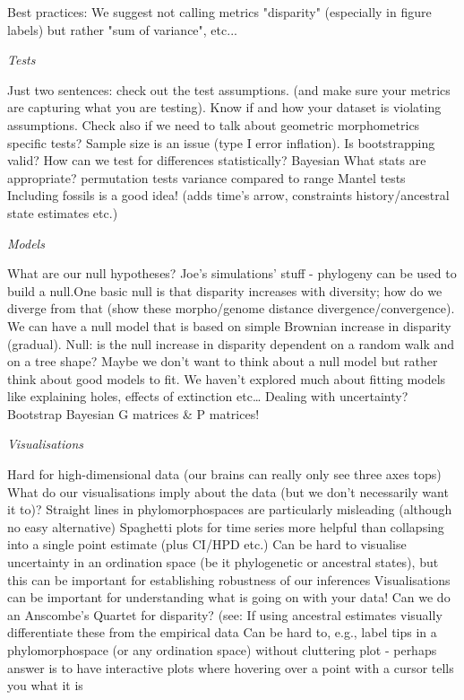 \documentclass[12pt,letterpaper]{article}
\renewcommand{\subsection}[1]{%
\bigskip
\begin{center}
\begin{large}
\normalfont\itshape #1
\end{large}
\end{center}}
\begin{document}
Best practices:
We suggest not calling metrics "disparity" (especially in figure labels) but rather "sum of variance", etc...

\subsection{Tests}
Just two sentences: check out the test assumptions. (and make sure your metrics are capturing what you are testing). Know if and how your dataset is violating assumptions. Check also if we need to talk about geometric morphometrics specific tests?
Sample size is an issue (type I error inflation).
Is bootstrapping valid?
How can we test for differences statistically?
Bayesian
What stats are appropriate?
permutation tests
variance compared to range
Mantel tests
Including fossils is a good idea! (adds time’s arrow, constraints history/ancestral state estimates etc.)

\subsection{Models}
What are our null hypotheses?
Joe’s simulations’ stuff - phylogeny can be used to build a null.One basic null is that disparity increases with diversity; how do we diverge from that (show these morpho/genome distance divergence/convergence).
We can have a null model that is based on simple Brownian increase in disparity (gradual). 
Null: is the null increase in disparity dependent on a random walk and on a tree shape?
Maybe we don’t want to think about a null model but rather think about good models to fit. 
We haven’t explored much about fitting models like explaining holes, effects of extinction etc…
Dealing with uncertainty? Bootstrap Bayesian G matrices \& P matrices!

\subsection{Visualisations}
Hard for high-dimensional data (our brains can really only see three axes tops)
What do our visualisations imply about the data (but we don’t necessarily want it to)?
Straight lines in phylomorphospaces are particularly misleading (although no easy alternative)
Spaghetti plots for time series more helpful than collapsing into a single point estimate (plus CI/HPD etc.)
Can be hard to visualise uncertainty in an ordination space (be it phylogenetic or ancestral states), but this can be important for establishing robustness of our inferences
Visualisations can be important for understanding what is going on with your data!
Can we do an Anscombe’s Quartet for disparity? (see: %
If using ancestral estimates visually differentiate these from the empirical data
Can be hard to, e.g., label tips in a phylomorphospace (or any ordination space) without cluttering plot - perhaps answer is to have interactive plots where hovering over a point with a cursor tells you what it is
\end{document}
